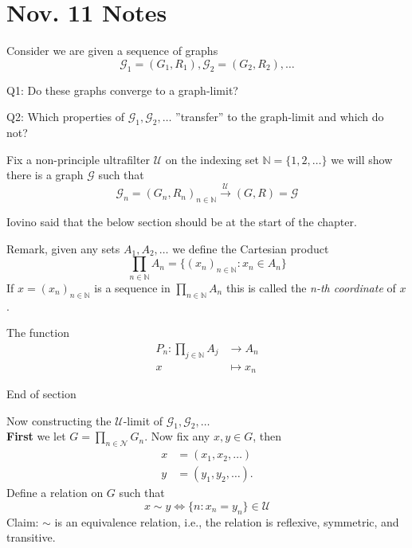 \documentclass{maatext}
\theoremstyle{definition}
\theoremstyle{remark}
\numberwithin{section}{chapter}
\numberwithin{equation}{chapter}
\begin{document}
\newpage

\section{Nov. 11 Notes}

Consider we are given a sequence of graphs
$$\mathscr{G}_1 = (G_1,R_1), \mathscr{G}_2 = (G_2,R_2), \dots$$

Q1: Do these graphs converge to a graph-limit?

Q2: Which properties of $\mathscr{G}_1, \mathscr{G}_2, \dots$ 
''transfer'' to the graph-limit and which do not?

Fix a non-principle ultrafilter $\mathscr{U}$ on the indexing set $\mathbb{N} = \{1, 2, \dots \}$ we will show there is a graph $\mathscr{G}$ such that
$$\mathscr{G}_n = (G_n, R_n)_{n \in \mathbb{N}} \overset{\mathscr{U}}\to (G,R) = \mathscr{G}$$

\begin{center}\color{red}
Iovino said that the below section should be at the start of the chapter.
\end{center}

Remark, given any sets $A_1, A_2, \dots$ we define the Cartesian product
$$\prod_{n \in \mathbb{N}} A_n = \{ (x_n)_{n \in \mathbb{N}} : x_n \in A_n \}$$
If $x = (x_n)_{n \in \mathbb{N}}$ is a sequence in $\prod_{n \in \mathbb{N}} A_n$ this is called the \textit{n-th coordinate} of $x$.

The function
\begin{align*}
P_n : \prod_{j \in \mathbb{N}} A_j &\to A_n\\
x &\mapsto x_n
\end{align*}

\begin{center}\color{red}
End of section
\end{center}
Now constructing the $\mathscr{U}$-limit of $\mathscr{G}_1, \mathscr{G}_2, \dots$\\
\textbf{First} we let $G = \prod_{n \in \mathscr{N}} G_n$. Now fix any $x,y \in G$, then 
\begin{align*}
x &= (x_1, x_2, \dots)\\
y &= (y_1, y_2, \dots).
\end{align*}
Define a relation on $G$ such that
$$x \sim y \iff \{ n : x_n = y_n \} \in \mathscr{U}$$
Claim: $\sim$ is an equivalence relation, i.e., the relation is reflexive, symmetric, and transitive.
\end{document}
